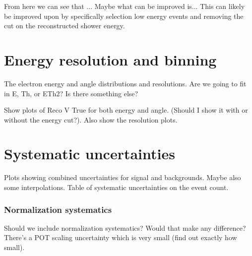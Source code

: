 \begin{figure}
\begin{scriptsize}
\label{tab:CutflowTableBackground}
\end{scriptsize}
\end{figure}

From here we can see that ... Maybe what can be improved is...
This can likely be improved upon by specifically selection low energy events and removing the cut on the reconstructed shower energy. 


\section{Energy resolution and binning}
The electron energy and angle distributions and resolutions. Are we going to fit in E, Th, or ETh2? Is there something else?

Show plots of Reco V True for both energy and angle. (Should I show it with or without the energy cut?). Also show the resolution plots.


\section{Systematic uncertainties}
\iffalse
{}
Plots showing combined uncertainties for signal and backgrounds. Maybe also some interpolations. Table of systematic uncertainties on the event count.

\subsubsection*{Normalization systematics}
Should we include normalization systematics? Would that make any difference? There's a POT scaling uncertainty which is very small (find out exactly how small).

